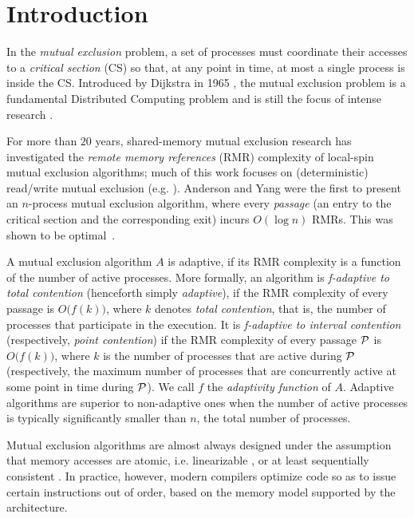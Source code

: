
\section{Introduction}

In the \emph{mutual exclusion} problem, a set of processes must coordinate their accesses to a \emph{critical section} (CS) so that, at any point in time, at most a single process is inside the CS.
Introduced by Dijkstra in 1965 \cite{Dij65}, the mutual exclusion problem is a fundamental Distributed Computing problem and is still the focus of intense research \cite{jand:surv,taubenfeld:book}.

For more than $20$ years, shared-memory mutual exclusion research has investigated the \emph{remote memory references} (RMR) complexity of local-spin mutual exclusion algorithms; much of this work focuses on (deterministic) read/write mutual exclusion (e.g. \cite{DBLP:conf/wdag/DanekG08,jaya:abort,DBLP:conf/sofsem/JayantiPN05,DBLP:journals/dc/KimA12,yang:fast}). Anderson and Yang were the first to present an $n$-process mutual exclusion algorithm, where every \emph{passage} (an entry to the critical section and the corresponding exit) incurs $O(\log n)$ RMRs. This was shown to be optimal~\cite{DBLP:conf/stoc/AttiyaHW08,FanL2006}.

A mutual exclusion algorithm $A$ is adaptive, if its RMR complexity is a function of the number of active processes. More formally, an algorithm is \emph{f-adaptive to total contention} (henceforth simply \textit{adaptive}), if the RMR complexity of every passage is $O\big(f(k)\big)$, where $k$ denotes \textit{total contention}, that is, the number of processes that participate in the execution. It is \emph{f-adaptive to interval contention} (respectively, \emph{point contention}) if the RMR complexity of every passage $\cal{P}$ is $O\big(f(k)\big)$, where $k$ is the number of processes that are active during $\cal{P}$ (respectively, the maximum number of processes that are concurrently active at some point in time during $\cal{P}$). We call $f$ the \emph{adaptivity function} of $A$.
Adaptive algorithms are superior to non-adaptive ones when the number of active processes is typically significantly smaller than $n$, the total number of processes.

Mutual exclusion algorithms are
almost always designed under the assumption that memory accesses are
atomic, i.e. linearizable \cite{HerlihyWingLinearizability}, or at least sequentially consistent \cite{DBLP:journals/tc/Lamport97}.
In practice, however, modern compilers optimize code so as
to issue certain instructions out of order,
based on the memory model supported by the architecture.


